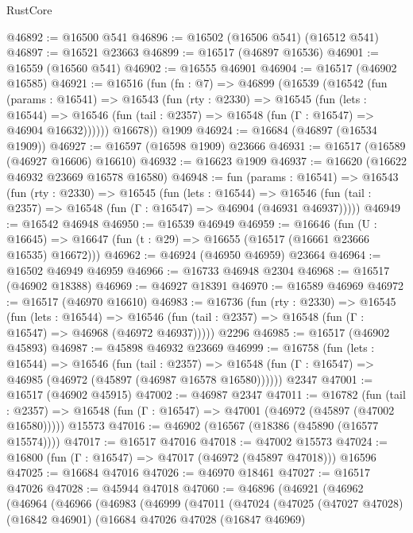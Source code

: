 \begin{lexlean}{RustCore}
\begin{coremodule}
@46892 := @16500 @541
@46896 := @16502 (@16506 @541) (@16512 @541)
@46897 := @16521 @23663
@46899 := @16517 (@46897 @16536)
@46901 := @16559 (@16560 @541)
@46902 := @16555 @46901
@46904 := @16517 (@46902 @16585)
@46921 := @16516
    (fun (fn : @7) =>
    @46899
      (@16539
        (@16542
          (fun (params : @16541) =>
          @16543
            (fun (rty : @2330) =>
            @16545
              (fun (lets : @16544) =>
              @16546 (fun (tail : @2357) => @16548 (fun (Γ : @16547) => @46904 @16632))))))
        @16678))
    @1909
@46924 := @16684 (@46897 (@16534 @1909))
@46927 := @16597 (@16598 @1909) @23666
@46931 := @16517 (@16589 (@46927 @16606) @16610)
@46932 := @16623 @1909
@46937 := @16620 (@16622 @46932 @23669 @16578 @16580)
@46948 := fun (params : @16541) =>
  @16543
    (fun (rty : @2330) =>
    @16545
      (fun (lets : @16544) =>
      @16546 (fun (tail : @2357) => @16548 (fun (Γ : @16547) => @46904 (@46931 @46937)))))
@46949 := @16542 @46948
@46950 := @16539 @46949
@46959 := @16646
    (fun (U : @16645) => @16647 (fun (t : @29) => @16655 (@16517 (@16661 @23666 @16535) @16672)))
@46962 := @46924 (@46950 @46959) @23664
@46964 := @16502 @46949 @46959
@46966 := @16733 @46948 @2304
@46968 := @16517 (@46902 @18388)
@46969 := @46927 @18391
@46970 := @16589 @46969
@46972 := @16517 (@46970 @16610)
@46983 := @16736
    (fun (rty : @2330) =>
    @16545
      (fun (lets : @16544) =>
      @16546 (fun (tail : @2357) => @16548 (fun (Γ : @16547) => @46968 (@46972 @46937)))))
    @2296
@46985 := @16517 (@46902 @45893)
@46987 := @45898 @46932 @23669
@46999 := @16758
    (fun (lets : @16544) =>
    @16546
      (fun (tail : @2357) =>
      @16548 (fun (Γ : @16547) => @46985 (@46972 (@45897 (@46987 @16578 @16580))))))
    @2347
@47001 := @16517 (@46902 @45915)
@47002 := @46987 @2347
@47011 := @16782
    (fun (tail : @2357) => @16548 (fun (Γ : @16547) => @47001 (@46972 (@45897 (@47002 @16580)))))
    @15573
@47016 := @46902 (@16567 (@18386 (@45890 (@16577 @15574))))
@47017 := @16517 @47016
@47018 := @47002 @15573
@47024 := @16800 (fun (Γ : @16547) => @47017 (@46972 (@45897 @47018))) @16596
@47025 := @16684 @47016
@47026 := @46970 @18461
@47027 := @16517 @47026
@47028 := @45944 @47018
@47060 := @46896
    (@46921
      (@46962
        (@46964
          (@46966
            (@46983
              (@46999
                (@47011
                  (@47024
                    (@47025
                      (@47027 @47028)
                      (@16842 @46901)
                      (@16684
                        @47026
                        @47028
                        (@16847 @46969)

\end{coremodule}
\end{lexlean}
